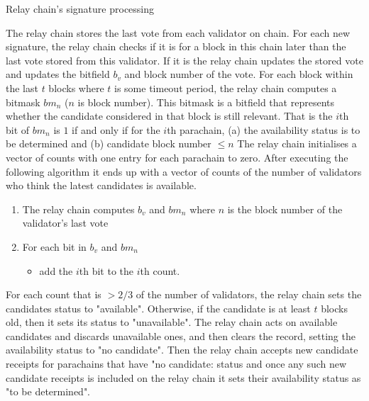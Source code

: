 \begin{algorithm}[H]
  \caption[]{Relay chain's signature processing}
  \label{algo-singnature-processing}
  \begin{algorithmic}[1]
\State The relay chain stores the last vote from each validator on chain. For each new signature, the relay chain checks if it is for a block in this chain later than the last vote stored from this validator. If it is the relay chain updates the stored vote and updates the bitfield $b_v$ and block number of the vote.
\State For each block within the last $t$ blocks where $t$ is some timeout period, the relay chain computes a bitmask $bm_n$ ($n$ is block number). This bitmask is a bitfield that represents whether the candidate considered in that block is still relevant. That is the $i$th bit of $bm_n$ is $1$ if and only if for the $i$th parachain,
    (a) the availability status is to be determined and
    (b) candidate block number $\leq n$
\State The relay chain initialises a vector of counts with one entry for each parachain to zero. After executing the following algorithm it ends up with a vector of counts  of the number of validators who think the latest candidates is available.
	\begin{enumerate}
    \item The relay chain computes
    $b_v$ and $bm_n$
    where $n$ is the block number of the validator's last vote
   \item For each bit in $b_v$ and $bm_n$
		\begin{itemize}
        \item add the $i$th bit to the $i$th count.
        \end{itemize}
	\end{enumerate}
\State For each count that is $>2/3$ of the number of validators, the relay chain sets the candidates status to "available". Otherwise, if the candidate is at least $t$ blocks old, then it sets its status to "unavailable".
\State The relay chain acts on available candidates and discards unavailable ones, and then clears the record, setting the availability status to "no candidate". Then the relay chain accepts new candidate receipts for parachains that have "no candidate: status and once any such new candidate receipts is included on the relay chain it sets their availability status as "to be determined".
\end{algorithmic}
\end{algorithm}

